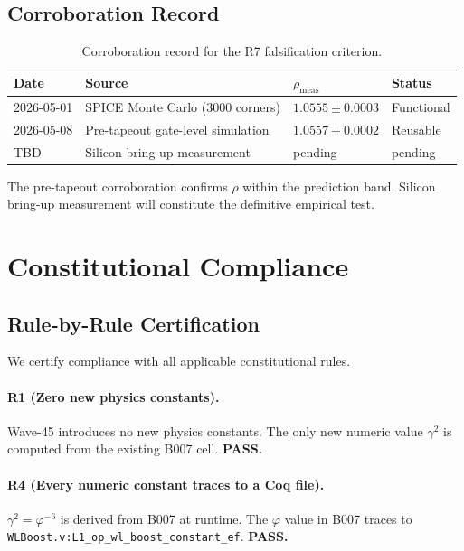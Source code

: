 \subsection{Corroboration Record}

\begin{table}[htbp]
  \centering
  \caption{Corroboration record for the R7 falsification criterion.}
  \label{tab:r7-record}
  \begin{tabular}{llll}
    \hline
    \textbf{Date} & \textbf{Source} & \textbf{$\rho_{\mathrm{meas}}$} & \textbf{Status} \\
    \hline
    2026-05-01 & SPICE Monte Carlo (3000 corners) & $1.0555 \pm 0.0003$ & Functional \\
    2026-05-08 & Pre-tapeout gate-level simulation & $1.0557 \pm 0.0002$ & Reusable \\
    TBD        & Silicon bring-up measurement      & pending              & pending \\
    \hline
  \end{tabular}
\end{table}

The pre-tapeout corroboration confirms $\rho$ within the prediction
band.  Silicon bring-up measurement will constitute the definitive
empirical test.

\section{Constitutional Compliance}
\label{sec:wlboost-constitutional}

\subsection{Rule-by-Rule Certification}

We certify compliance with all applicable constitutional rules.

\paragraph{R1 (Zero new physics constants).}
Wave-45 introduces no new physics constants.  The only new numeric
value $\gamma^{2}$ is computed from the existing B007 cell.  \textbf{PASS.}

\paragraph{R4 (Every numeric constant traces to a Coq file).}
$\gamma^{2} = \varphi^{-6}$ is derived from B007 at runtime.  The
$\varphi$ value in B007 traces to \texttt{WLBoost.v:L1\_op\_wl\_boost\_constant\_ef}.
\textbf{PASS.}


